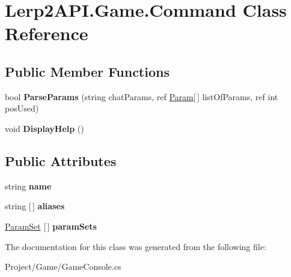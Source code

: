 \hypertarget{class_lerp2_a_p_i_1_1_game_1_1_command}{}\section{Lerp2\+A\+P\+I.\+Game.\+Command Class Reference}
\label{class_lerp2_a_p_i_1_1_game_1_1_command}
\subsection*{Public Member Functions}
\begin{DoxyCompactItemize}
\item 
\mbox{\label{class_lerp2_a_p_i_1_1_game_1_1_command_ab91b110ae9c032477d20eee8925d0d66}} 
bool {\bfseries Parse\+Params} (string chat\+Params, ref \hyperlink{class_lerp2_a_p_i_1_1_game_1_1_param}{Param}\mbox{[}$\,$\mbox{]} list\+Of\+Params, ref int pos\+Used)
\item 
\mbox{\label{class_lerp2_a_p_i_1_1_game_1_1_command_a72ec5363a41d6d92d2a65f0c285f0165}} 
void {\bfseries Display\+Help} ()
\end{DoxyCompactItemize}
\subsection*{Public Attributes}
\begin{DoxyCompactItemize}
\item 
\mbox{\label{class_lerp2_a_p_i_1_1_game_1_1_command_ad5e16e070632ee3c932fd15d7b0801a6}} 
string {\bfseries name}
\item 
\mbox{\label{class_lerp2_a_p_i_1_1_game_1_1_command_a966e72b0127fcfb4f1fd6d06ff3e4c98}} 
string \mbox{[}$\,$\mbox{]} {\bfseries aliases}
\item 
\mbox{\label{class_lerp2_a_p_i_1_1_game_1_1_command_a723913c3b312b67045b7ca68880aa054}} 
\hyperlink{class_lerp2_a_p_i_1_1_game_1_1_param_set}{Param\+Set} \mbox{[}$\,$\mbox{]} {\bfseries param\+Sets}
\end{DoxyCompactItemize}


The documentation for this class was generated from the following file\+:\begin{DoxyCompactItemize}
\item 
Project/\+Game/Game\+Console.\+cs\end{DoxyCompactItemize}
